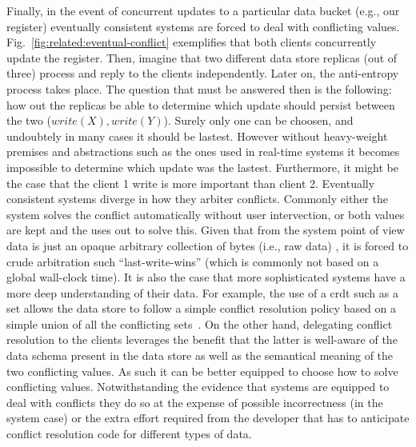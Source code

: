 Finally, in the event of concurrent updates to a particular data bucket (e.g., our register) eventually consistent systems are forced to deal with conflicting values. 
Fig.~\ref{fig:related:eventual-conflict} exemplifies that  both clients concurrently update the register. 
Then, imagine that two different data store replicas (out of three) process and reply to the clients independently. 
Later on, the anti-entropy process takes place. The question that must be answered then is the following: how out the replicas be able to determine which update should persist between the two ($write(X), write(Y)$). 
Surely only one can be choosen, and undoubtely in many cases it should be lastest. 
However without heavy-weight premises and abstractions  such as the ones used in real-time systems it becomes impossible to determine which update was the lastest. 
Furthermore, it might be the case that the client 1 write is more important than client 2. 
Eventually consistent systems diverge in how they arbiter conflicts. 
Commonly either the system solves the conflict automatically without user intervection, or both values are kept and the uses out to solve this. 
Given that from the system point of view data is just an opaque arbitrary collection of bytes (i.e., raw data) , it is forced to crude arbitration such ``last-write-wins'' (which is commonly not based on a global wall-clock time). It is also the case that more sophisticated systems have a more deep understanding of their data. 
For example, the use of a \gls{crdt} such as a set allows the data store to follow a simple conflict resolution policy  based on a simple union of all the conflicting sets~\cite{shapiro:inria-00555588}. 
On the other hand, delegating conflict resolution to the clients leverages the benefit that the latter is well-aware of the data schema present in the data store as well as the semantical meaning of the two conflicting values. 
As such it can be better equipped to choose how to solve conflicting values.
Notwithstanding  the evidence that systems are equipped to deal with conflicts they do so at the expense of possible incorrectness (in the system case) or the extra effort required from the developer that has to anticipate conflict resolution code for different types of data. 


